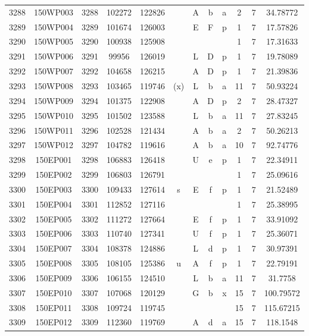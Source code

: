 \begin{tabular}{|*{12}{c|}}
3288 & 150WP003 & 3288 & 102272 & 122826 &  & A & b & a & 2 & 7 & 34.78772 \\ 
3289 & 150WP004 & 3289 & 101674 & 126003 &  & E & F & p & 1 & 7 & 17.57826 \\ 
3290 & 150WP005 & 3290 & 100938 & 125908 &  &  &  &  & 1 & 7 & 17.31633 \\ 
3291 & 150WP006 & 3291 & 99956 & 126019 &  & L & D & p & 1 & 7 & 19.78089 \\ 
3292 & 150WP007 & 3292 & 104658 & 126215 &  & A & D & p & 1 & 7 & 21.39836 \\ 
3293 & 150WP008 & 3293 & 103465 & 119746 & (x) & L & b & a & 11 & 7 & 50.93224 \\ 
3294 & 150WP009 & 3294 & 101375 & 122908 &  & A & D & p & 2 & 7 & 28.47327 \\ 
3295 & 150WP010 & 3295 & 101502 & 123588 &  & L & b & a & 11 & 7 & 27.83245 \\ 
3296 & 150WP011 & 3296 & 102528 & 121434 &  & A & b & a & 2 & 7 & 50.26213 \\ 
3297 & 150WP012 & 3297 & 104782 & 119616 &  & A & b & a & 10 & 7 & 92.74776 \\ 
3298 & 150EP001 & 3298 & 106883 & 126418 &  & U & e & p & 1 & 7 & 22.34911 \\ 
3299 & 150EP002 & 3299 & 106803 & 126791 &  &  &  &  & 1 & 7 & 25.09616 \\ 
3300 & 150EP003 & 3300 & 109433 & 127614 & s & E & f & p & 1 & 7 & 21.52489 \\ 
3301 & 150EP004 & 3301 & 112852 & 127116 &  &  &  &  & 1 & 7 & 25.38995 \\ 
3302 & 150EP005 & 3302 & 111272 & 127664 &  & E & f & p & 1 & 7 & 33.91092 \\ 
3303 & 150EP006 & 3303 & 110740 & 127341 &  & U & f & p & 1 & 7 & 25.36071 \\ 
3304 & 150EP007 & 3304 & 108378 & 124886 &  & L & d & p & 1 & 7 & 30.97391 \\ 
3305 & 150EP008 & 3305 & 108105 & 125386 & u & A & f & p & 1 & 7 & 22.79191 \\ 
3306 & 150EP009 & 3306 & 106155 & 124510 &  & L & b & a & 11 & 7 & 31.7758 \\ 
3307 & 150EP010 & 3307 & 107068 & 120129 &  & G & b & x & 15 & 7 & 100.79572 \\ 
3308 & 150EP011 & 3308 & 109724 & 119745 &  &  &  &  & 15 & 7 & 115.67215 \\ 
3309 & 150EP012 & 3309 & 112360 & 119769 &  & A & d & a & 15 & 7 & 118.1548 \\ 

\end{tabular}
